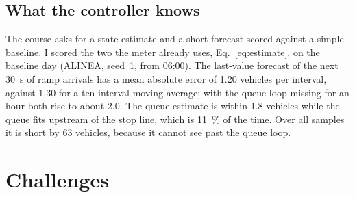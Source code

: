 \documentclass[11pt,letterpaper]{article}
\begin{document}
\FloatBarrier
\subsection{What the controller knows}

The course asks for a state estimate and a short forecast scored against a simple
baseline. I scored the two the meter already uses, Eq.~\eqref{eq:estimate}, on the
baseline day (ALINEA, seed~1, from 06:00). The last-value forecast of the next 30~s of
ramp arrivals has a mean absolute error of 1.20 vehicles per interval, against 1.30 for
a ten-interval moving average; with the queue loop missing for an hour both rise to
about 2.0. The queue estimate is within 1.8 vehicles while the queue fits upstream of
the stop line, which is 11~\% of the time. Over all samples it is short by 63 vehicles,
because it cannot see past the queue loop.

\FloatBarrier
\section{Challenges}
\end{document}
